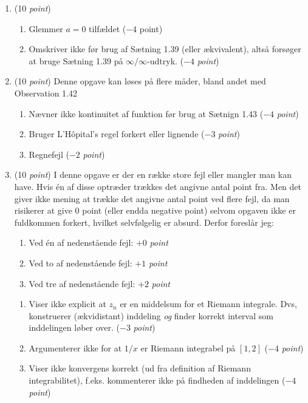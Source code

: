 \documentclass{article}
\begin{document}
\begin{opg}\hfill
	\begin{enumerate}
		\item (10 \emph{point}) \begin{enumerate}[label=(\roman*)]
			\item Glemmer $ a=0 $ tilfældet ($ -4 $ point)
			\item Omskriver ikke før brug af Sætning 1.39 (eller ækvivalent), altså forsøger at bruge Sætning 1.39 på $ \infty/\infty $-udtryk. ($ -4 $ \emph{point})
		\end{enumerate}
		\item (10 \emph{point}) Denne opgave kan løses på flere måder, bland andet med Observation 1.42 \begin{enumerate}[label=(\roman*)]
			\item Nævner ikke kontinuitet af funktion før brug at Sætnign 1.43 ($ -4 $ \emph{point})
			\item Bruger L'H\^opital's regel forkert eller lignende ($ -3 $ \emph{point})
			\item Regnefejl ($ -2 $ \emph{point})
			
		\end{enumerate}
		\item (10 \emph{point}) I denne opgave er der en række store fejl eller mangler man kan have. Hvis én af disse optræder trækkes det angivne antal point fra. Men det giver ikke mening at trække det angivne antal point ved flere fejl, da man risikerer at give $ 0 $ point (eller endda negative point) selvom opgaven ikke er fuldkommen forkert, hvilket selvfølgelig er absurd. Derfor foreslår jeg:
		\begin{enumerate}[label=(\Roman*)]
			\item Ved én af nedenstående fejl: $ +0 $ \emph{point}
			\item Ved to af nedenstående fejl: $ +1 $ \emph{point}
			\item Ved tre af nedenstående fejl: $ +2 $ \emph{point}
		\end{enumerate}
		\begin{enumerate}[label=(\roman*)]
			\item Viser ikke explicit at $ z_n $ er en middelsum for et Riemann integrale. Dvs, konstruerer (ækvidistant) inddeling \emph{og} finder korrekt interval som inddelingen løber over. ($ -3 $ \emph{point}) 
			\item Argumenterer ikke for at $ 1/x $ er Riemann integrabel på $ [1,2] $ ($ -4 $ \emph{point})
			\item Viser ikke konvergens korrekt (ud fra definition af Riemann integrabilitet), f.eks. kommenterer ikke på findheden af inddelingen ($ -4 $ \emph{point})
		\end{enumerate}
	\end{enumerate}
\end{opg}
\end{document}
